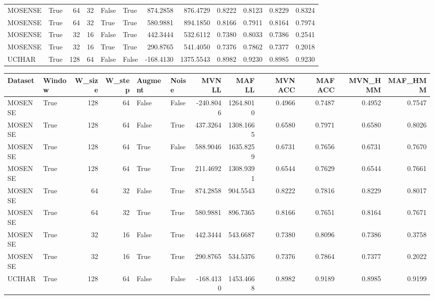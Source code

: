 \documentclass{article}
\begin{document}
\begin{tabular}{llrrllrrrrrr}
	MOSENSE &    True &      64 &      32 &    False &   True &  874.2858 &  876.4729 &   0.8222 &   0.8123 &   0.8229 &   0.8324 \\
	MOSENSE &    True &      64 &      32 &     True &   True &  580.9881 &  894.1850 &   0.8166 &   0.7911 &   0.8164 &   0.7974 \\
	MOSENSE &    True &      32 &      16 &    False &   True &  442.3444 &  532.6112 &   0.7380 &   0.8033 &   0.7386 &   0.2541 \\
	MOSENSE &    True &      32 &      16 &     True &   True &  290.8765 &  541.4050 &   0.7376 &   0.7862 &   0.7377 &   0.2018 \\
	UCIHAR &    True &     128 &      64 &    False &  False & -168.4130 & 1375.5543 &   0.8982 &   0.9230 &   0.8985 &   0.9230 \\
	\bottomrule
\end{tabular}


\begin{tabular}{llrrllrrrrrr}
	\toprule
	Dataset &  Window &  W\_size &  W\_step &  Augment &  Noise &    MVN LL &    MAF LL &  MVN ACC &  MAF ACC &  MVN\_HMM &  MAF\_HMM \\
	\midrule
	MOSENSE &    True &     128 &      64 &    False &  False & -240.8046 & 1264.8010 &   0.4966 &   0.7487 &   0.4952 &   0.7547 \\
	MOSENSE &    True &     128 &      64 &    False &   True &  437.3264 & 1308.1665 &   0.6580 &   0.7971 &   0.6580 &   0.8026 \\
	MOSENSE &    True &     128 &      64 &     True &  False &  588.9046 & 1635.8259 &   0.6731 &   0.7656 &   0.6731 &   0.7670 \\
	MOSENSE &    True &     128 &      64 &     True &   True &  211.4692 & 1308.9391 &   0.6544 &   0.7629 &   0.6544 &   0.7661 \\
	MOSENSE &    True &      64 &      32 &    False &   True &  874.2858 &  904.5543 &   0.8222 &   0.7816 &   0.8229 &   0.8017 \\
	MOSENSE &    True &      64 &      32 &     True &   True &  580.9881 &  896.7365 &   0.8166 &   0.7651 &   0.8164 &   0.7671 \\
	MOSENSE &    True &      32 &      16 &    False &   True &  442.3444 &  543.6687 &   0.7380 &   0.8096 &   0.7386 &   0.3758 \\
	MOSENSE &    True &      32 &      16 &     True &   True &  290.8765 &  534.5376 &   0.7376 &   0.7864 &   0.7377 &   0.2022 \\
	UCIHAR &    True &     128 &      64 &    False &  False & -168.4130 & 1453.4668 &   0.8982 &   0.9189 &   0.8985 &   0.9199 \\
	\bottomrule
\end{tabular}
\end{document}
